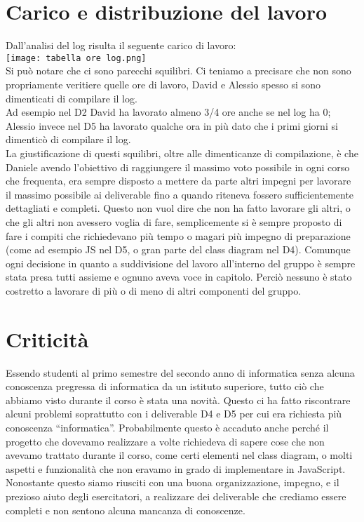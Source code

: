 \documentclass{article}
\begin{document}
   \section{Carico e distribuzione del lavoro}
   Dall'analisi del log risulta il seguente carico di lavoro:\\
   \texttt{[image: tabella ore log.png]}\\
   Si può notare che ci sono parecchi squilibri. Ci teniamo a precisare che non sono propriamente veritiere quelle ore di lavoro, David e Alessio spesso si sono dimenticati di compilare il log.\\
   Ad esempio nel D2 David ha lavorato almeno 3/4 ore anche se nel log ha 0; Alessio invece nel D5 ha lavorato qualche ora in più dato che i primi giorni si dimenticò di compilare il log.\\
   La giustificazione di questi squilibri, oltre alle dimenticanze di compilazione, è che Daniele avendo l’obiettivo di raggiungere il massimo voto possibile in ogni corso che frequenta, era sempre disposto a mettere da parte altri impegni per lavorare il massimo possibile ai deliverable fino a quando riteneva fossero sufficientemente dettagliati e completi. Questo non vuol dire che non ha fatto lavorare gli altri, o che gli altri non avessero voglia di fare, semplicemente si è sempre proposto di fare i compiti che richiedevano più tempo o magari più impegno di preparazione (come ad esempio JS nel D5, o gran parte del class diagram nel D4). Comunque ogni decisione in quanto a suddivisione del lavoro all’interno del gruppo è sempre stata presa tutti assieme e ognuno aveva voce in capitolo. Perciò nessuno è stato costretto a lavorare di più o di meno di altri componenti del gruppo.
   \section{Criticità}
   Essendo studenti al primo semestre del secondo anno di informatica senza alcuna conoscenza pregressa di informatica da un istituto superiore, tutto ciò che abbiamo visto durante il corso è stata una novità. Questo ci ha fatto riscontrare alcuni problemi soprattutto con i deliverable D4 e D5 per cui era richiesta più conoscenza “informatica”. Probabilmente questo è accaduto anche perché il progetto che dovevamo realizzare a volte richiedeva di sapere cose che non avevamo trattato durante il corso, come certi elementi nel class diagram, o molti aspetti e funzionalità che non eravamo in grado di implementare in JavaScript. Nonostante questo siamo riusciti con una buona organizzazione, impegno, e il prezioso aiuto degli esercitatori, a realizzare dei deliverable che crediamo essere completi e non sentono alcuna mancanza di conoscenze. 
\end{document}
